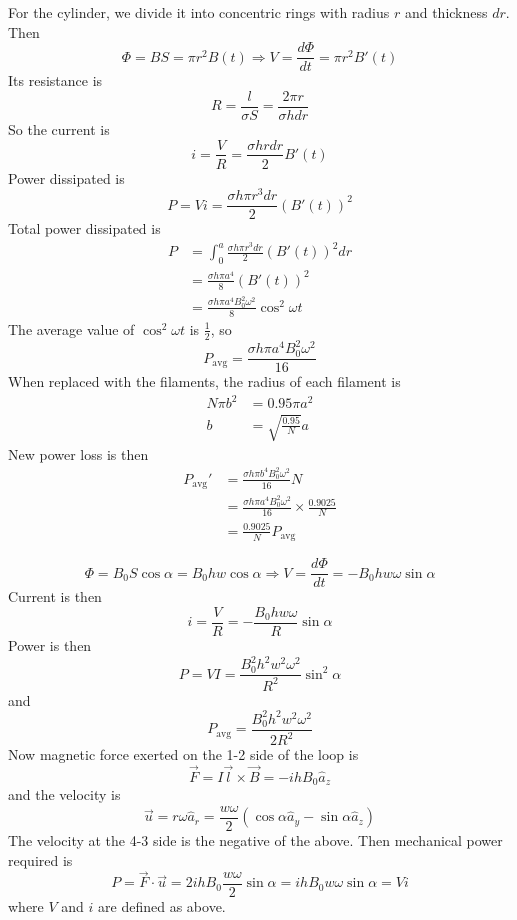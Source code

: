 \documentclass[answers]{exam}
\begin{document}
\begin{questions}
\begin{solution}
    For the cylinder, we divide it into concentric rings with radius $r$ and thickness $dr$. Then
    $$\Phi = BS = \pi r^2B(t) \Rightarrow V = \frac{d\Phi}{dt} = \pi r^2B'(t)$$
    Its resistance is
    $$R = \frac{l}{\sigma S} = \frac{2\pi r}{\sigma hdr}$$
    So the current is
    $$i = \frac{V}{R} = \frac{\sigma hrdr}{2}B'(t)$$
    Power dissipated is
    $$P = Vi = \frac{\sigma h\pi r^3dr}{2} (B'(t))^2$$
    Total power dissipated is
    \begin{align*}
        P &= \int_0^a \frac{\sigma h\pi r^3dr}{2} (B'(t))^2 dr \\
          &= \frac{\sigma h\pi a^4}{8} (B'(t))^2 \\
          &= \frac{\sigma h\pi a^4 B_0^2\omega^2}{8} \cos^2\omega t
    \end{align*}
    The average value of $\cos^2\omega t$ is $\frac{1}{2}$, so
    $$P_{\text{avg}} = \frac{\sigma h\pi a^4 B_0^2\omega^2}{16}$$
    When replaced with the filaments, the radius of each filament is
    \begin{align*}
        N\pi b^2 &= 0.95\pi a^2 \\
        b &= \sqrt{\frac{0.95}{N}}a
    \end{align*}
    New power loss is then
    \begin{align*}
        P_{\text{avg}}' &= \frac{\sigma h\pi b^4 B_0^2\omega^2}{16} N \\
                        &= \frac{\sigma h\pi a^4 B_0^2\omega^2}{16} \times \frac{0.9025}{N} \\
                        &= \frac{0.9025}{N} P_{\text{avg}}
    \end{align*}
\end{solution}


\begin{solution}
    $$\Phi = B_0S\cos\alpha = B_0hw\cos\alpha \Rightarrow V = \frac{d\Phi}{dt} = -B_0hw\omega\sin\alpha$$
    Current is then
    $$i = \frac{V}{R} = -\frac{B_0hw\omega}{R} \sin\alpha$$
    Power is then
    $$P = VI = \frac{B_0^2h^2w^2\omega^2}{R^2} \sin^2\alpha$$
    and
    $$P_{\text{avg}} = \frac{B_0^2h^2w^2\omega^2}{2R^2}$$
    Now magnetic force exerted on the 1-2 side of the loop is
    $$\vec F = I\vec l \times \vec B = -ihB_0\hat a_z$$
    and the velocity is
    $$\vec u = r\omega \hat a_r = \frac{w\omega}{2}(\cos\alpha\hat a_y - \sin\alpha \hat a_z)$$
    The velocity at the 4-3 side is the negative of the above. Then mechanical power required is
    $$P = \vec F \cdot \vec u = 2ihB_0\frac{w\omega}{2}\sin\alpha = ihB_0w\omega\sin\alpha = Vi$$
    where $V$ and $i$ are defined as above.
\end{solution}
\end{questions}
\end{document}
